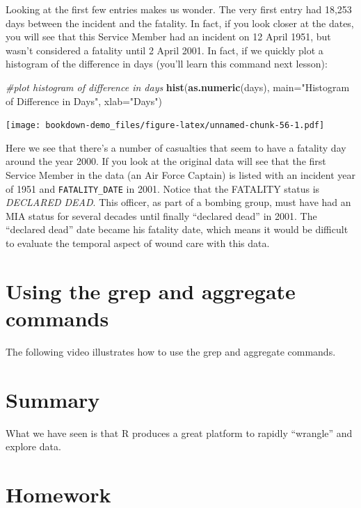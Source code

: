 \documentclass[]{book}
\newenvironment{Shaded}{\begin{snugshade}}{\end{snugshade}}
\newcommand{\KeywordTok}[1]{\textcolor[rgb]{0.13,0.29,0.53}{\textbf{{#1}}}}
\newcommand{\DataTypeTok}[1]{\textcolor[rgb]{0.13,0.29,0.53}{{#1}}}
\newcommand{\StringTok}[1]{\textcolor[rgb]{0.31,0.60,0.02}{{#1}}}
\newcommand{\CommentTok}[1]{\textcolor[rgb]{0.56,0.35,0.01}{\textit{{#1}}}}
\newcommand{\NormalTok}[1]{{#1}}
\begin{document}
Looking at the first few entries makes us wonder. The very first entry
had 18,253 days between the incident and the fatality. In fact, if you
look closer at the dates, you will see that this Service Member had an
incident on 12 April 1951, but wasn't considered a fatality until 2
April 2001. In fact, if we quickly plot a histogram of the difference in
days (you'll learn this command next lesson):

\begin{Shaded}
\begin{Highlighting}[]
\CommentTok{#plot histogram of difference in days}
\KeywordTok{hist}\NormalTok{(}\KeywordTok{as.numeric}\NormalTok{(days), }\DataTypeTok{main=}\StringTok{"Histogram of Difference in Days"}\NormalTok{, }\DataTypeTok{xlab=}\StringTok{"Days"}\NormalTok{)  }
\end{Highlighting}
\end{Shaded}

\texttt{[image: bookdown-demo\_files/figure-latex/unnamed-chunk-56-1.pdf]}

Here we see that there's a number of casualties that seem to have a
fatality day around the year 2000. If you look at the original data will
see that the first Service Member in the data (an Air Force Captain) is
listed with an incident year of 1951 and \texttt{FATALITY\_DATE} in
2001. Notice that the FATALITY status is \emph{DECLARED DEAD}. This
officer, as part of a bombing group, must have had an MIA status for
several decades until finally ``declared dead'' in 2001. The ``declared
dead'' date became his fatality date, which means it would be difficult
to evaluate the temporal aspect of wound care with this data.

\section{Using the grep and aggregate
commands}\label{using-the-grep-and-aggregate-commands}

The following video illustrates how to use the grep and aggregate
commands.

\section{Summary}\label{summary}

What we have seen is that R produces a great platform to rapidly
``wrangle'' and explore data.

\section{Homework}\label{homework}
\end{document}

